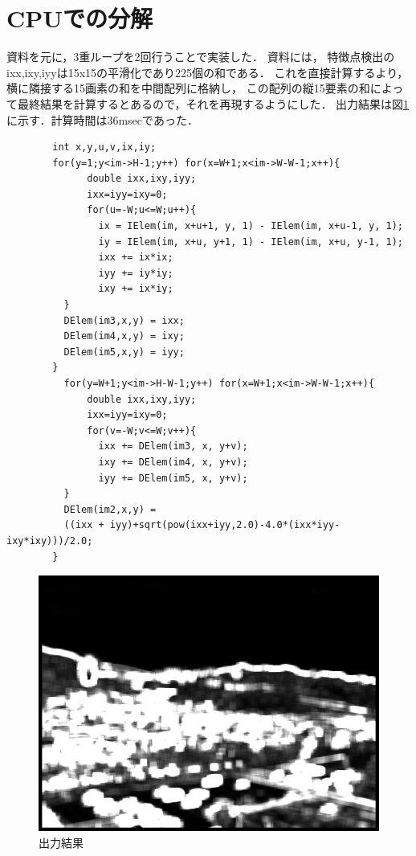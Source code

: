 \documentclass[11pt]{jarticle}
\begin{document}
\section{CPUでの分解}
資料を元に，3重ループを2回行うことで実装した．
資料には，
特徴点検出のixx,ixy,iyyは15x15の平滑化であり225個の和である．
これを直接計算するより，横に隣接する15画素の和を中間配列に格納し，
この配列の縦15要素の和によって最終結果を計算するとあるので，それを再現するようにした．
出力結果は図\ref{bunkai}に示す．計算時間は36msecであった．
\begin{verbatim}
        int x,y,u,v,ix,iy;
        for(y=1;y<im->H-1;y++) for(x=W+1;x<im->W-W-1;x++){
              double ixx,ixy,iyy;
              ixx=iyy=ixy=0;
              for(u=-W;u<=W;u++){
                ix = IElem(im, x+u+1, y, 1) - IElem(im, x+u-1, y, 1);
                iy = IElem(im, x+u, y+1, 1) - IElem(im, x+u, y-1, 1);
                ixx += ix*ix;
                iyy += iy*iy;
                ixy += ix*iy;
          }
          DElem(im3,x,y) = ixx;
          DElem(im4,x,y) = ixy;
          DElem(im5,x,y) = iyy;
        }
          for(y=W+1;y<im->H-W-1;y++) for(x=W+1;x<im->W-W-1;x++){
              double ixx,ixy,iyy;
              ixx=iyy=ixy=0;
              for(v=-W;v<=W;v++){
                ixx += DElem(im3, x, y+v);
                ixy += DElem(im4, x, y+v);
                iyy += DElem(im5, x, y+v);
          }
          DElem(im2,x,y) = 
          ((ixx + iyy)+sqrt(pow(ixx+iyy,2.0)-4.0*(ixx*iyy-ixy*ixy)))/2.0;
        }
\end{verbatim}
\begin{figure}[t]
    \centering
    \includegraphics[scale=.5]{out1.jpg}
    \caption{出力結果}
    \label{bunkai}
\end{figure}
\end{document}
